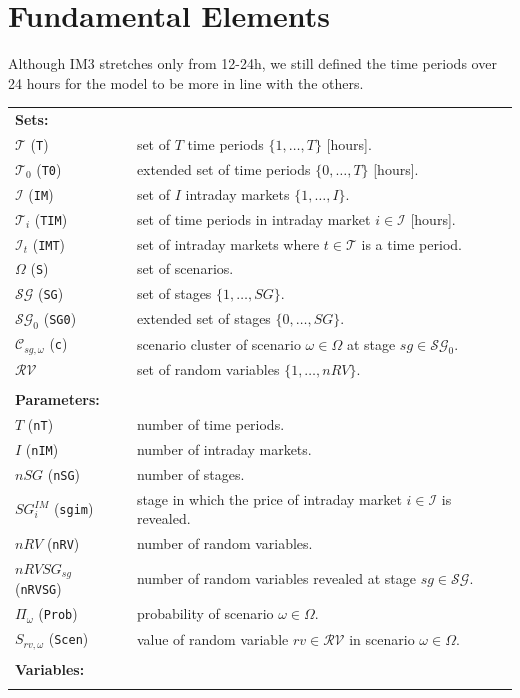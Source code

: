 \documentclass{article}
\begin{document}
\section{Fundamental Elements}
\label{SEC:FundamentalElements}
Although IM3 stretches only from 12-24h, we still defined the time periods over 24 hours for the model to be more in line with the others. 
\begin{tabularx}{\textwidth}{l l}
    \textbf{Sets:} \\
    $\mathcal{T}$ (\verb|T|) & set of $T$ time periods $\{ 1, \dots, T \}$ [hours]. \\
	$\mathcal{T}_0$ (\verb|T0|) & extended set of time periods $\{ 0, \dots, T \}$ [hours]. \\     
	$\mathcal{I}$ (\verb|IM|) & set of $I$ intraday markets $\{1, \dots, I \}$. \\    
    $\mathcal{T}_i$ (\verb|TIM|) & set of time periods in intraday market $i \in \mathcal{I}$ [hours]. \\
	$\mathcal{I}_t$ (\verb|IMT|) & set of intraday markets where $t \in \mathcal{T}$ is a time period. \\    
	$\Omega$ (\verb|S|) & set of scenarios. \\
	$\mathcal{SG}$ (\verb|SG|) & set of stages $\{1, \dots, SG \}$. \\
	$\mathcal{SG}_0$ (\verb|SG0|) & extended set of stages $\{0, \dots, SG \}$. \\     
    $\mathcal{C}_{sg, \omega}$ (\verb|c|) & scenario cluster of scenario $\omega \in \Omega$ at stage $sg \in \mathcal{SG}_0$. \\
    $\mathcal{RV}$ & set of random variables $\{1, \dots, nRV \}$. \\
    \\
   
    
    \textbf{Parameters:} \\
	$T$ (\verb|nT|) & number of time periods. \\
	$I$ (\verb|nIM|) & number of intraday markets. \\
	$nSG$ (\verb|nSG|) & number of stages. \\
	$SG^{IM}_i$ (\verb|sgim|) & stage in which the price of intraday market $i \in \mathcal{I}$ is revealed. \\
	$nRV$ (\verb|nRV|) & number of random variables. \\
	$nRVSG_{sg}$ (\verb|nRVSG|) & number of random variables revealed at stage $sg \in \mathcal{SG}$. \\
	$\Pi_{\omega}$ (\verb|Prob|) & probability of scenario $\omega \in \Omega$. \\
	$S_{rv, \omega}$ (\verb|Scen|) & value of random variable $rv \in \mathcal{RV}$ in scenario $\omega \in \Omega$. \\    
    \\
       
    \textbf{Variables:} \\
	\\
\end{tabularx}
\end{document}
